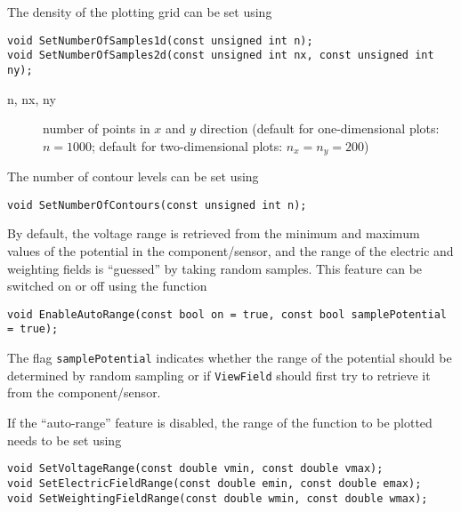 The density of the plotting grid can be set using
\begin{lstlisting}
void SetNumberOfSamples1d(const unsigned int n);
void SetNumberOfSamples2d(const unsigned int nx, const unsigned int ny);
\end{lstlisting}
\begin{description}
  \item[n, nx, ny]
  number of points in \(x\) and \(y\) direction 
  (default for one-dimensional plots: \(n = 1000\);
   default for two-dimensional plots: \(n_{x} = n_{y} = 200\)) 
\end{description}

The number of contour levels can be set using
\begin{lstlisting}
void SetNumberOfContours(const unsigned int n);
\end{lstlisting}

By default, the voltage range is retrieved from the 
minimum and maximum values of the 
potential in the component/sensor, and
the range of the electric and weighting fields is
``guessed'' by taking random samples.
This feature can be switched on or off using the function
\begin{lstlisting}
void EnableAutoRange(const bool on = true, const bool samplePotential = true);
\end{lstlisting}
The flag \texttt{samplePotential} indicates whether the range of the 
potential should be determined by random sampling or if \texttt{ViewField}
should first try to retrieve it from the component/sensor. 

If the ``auto-range'' feature is disabled,
the range of the function to be plotted needs to be set using
\begin{lstlisting}
void SetVoltageRange(const double vmin, const double vmax);
void SetElectricFieldRange(const double emin, const double emax);
void SetWeightingFieldRange(const double wmin, const double wmax);
\end{lstlisting}


